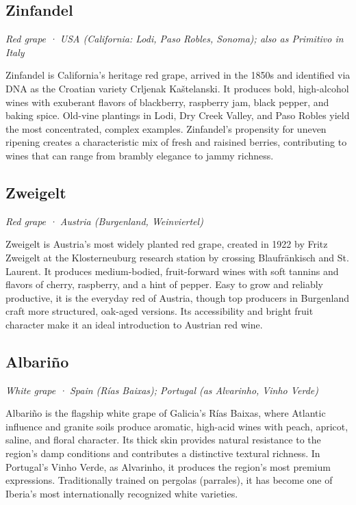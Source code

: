 \subsection*{Zinfandel}
\textit{Red grape · USA (California: Lodi, Paso Robles, Sonoma); also as Primitivo in Italy}\par\smallskip

Zinfandel is California’s heritage red grape, arrived in the 1850s and identified via DNA as the Croatian variety Crljenak Kaštelanski. It produces bold, high-alcohol wines with exuberant flavors of blackberry, raspberry jam, black pepper, and baking spice. Old-vine plantings in Lodi, Dry Creek Valley, and Paso Robles yield the most concentrated, complex examples. Zinfandel’s propensity for uneven ripening creates a characteristic mix of fresh and raisined berries, contributing to wines that can range from brambly elegance to jammy richness.

\subsection*{Zweigelt}
\textit{Red grape · Austria (Burgenland, Weinviertel)}\par\smallskip

Zweigelt is Austria’s most widely planted red grape, created in 1922 by Fritz Zweigelt at the Klosterneuburg research station by crossing Blaufränkisch and St. Laurent. It produces medium-bodied, fruit-forward wines with soft tannins and flavors of cherry, raspberry, and a hint of pepper. Easy to grow and reliably productive, it is the everyday red of Austria, though top producers in Burgenland craft more structured, oak-aged versions. Its accessibility and bright fruit character make it an ideal introduction to Austrian red wine.

\subsection*{Albariño}
\textit{White grape · Spain (Rías Baixas); Portugal (as Alvarinho, Vinho Verde)}\par\smallskip

Albariño is the flagship white grape of Galicia’s Rías Baixas, where Atlantic influence and granite soils produce aromatic, high-acid wines with peach, apricot, saline, and floral character. Its thick skin provides natural resistance to the region’s damp conditions and contributes a distinctive textural richness. In Portugal’s Vinho Verde, as Alvarinho, it produces the region’s most premium expressions. Traditionally trained on pergolas (parrales), it has become one of Iberia’s most internationally recognized white varieties.

